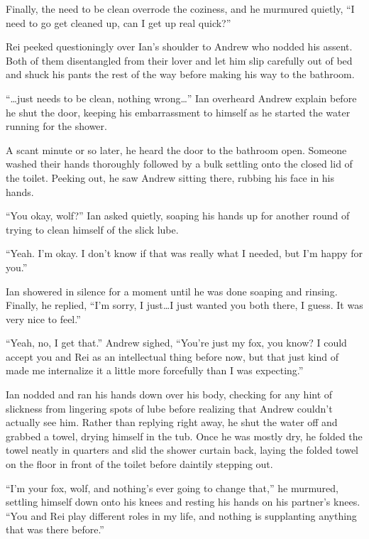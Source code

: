 \documentclass[12pt,letterpaper,oneside]{memoir}
\begin{document}
  Finally, the need to be clean overrode the coziness, and he murmured quietly, ``I need to go get cleaned up, can I get up real quick?''

  Rei peeked questioningly over Ian's shoulder to Andrew who nodded his assent. Both of them disentangled from their lover and let him slip carefully out of bed and shuck his pants the rest of the way before making his way to the bathroom.

  ``\ldots{}just needs to be clean, nothing wrong\ldots{}'' Ian overheard Andrew explain before he shut the door, keeping his embarrassment to himself as he started the water running for the shower.

  A scant minute or so later, he heard the door to the bathroom open. Someone washed their hands thoroughly followed by a bulk settling onto the closed lid of the toilet. Peeking out, he saw Andrew sitting there, rubbing his face in his hands.

  ``You okay, wolf?'' Ian asked quietly, soaping his hands up for another round of trying to clean himself of the slick lube.

  ``Yeah. I'm okay. I don't know if that was really what I needed, but I'm happy for you.''

  Ian showered in silence for a moment until he was done soaping and rinsing. Finally, he replied, ``I'm sorry, I just\ldots{}I just wanted you both there, I guess. It was very nice to feel.''

  ``Yeah, no, I get that.'' Andrew sighed, ``You're just my fox, you know? I could accept you and Rei as an intellectual thing before now, but that just kind of made me internalize it a little more forcefully than I was expecting.''

  Ian nodded and ran his hands down over his body, checking for any hint of slickness from lingering spots of lube before realizing that Andrew couldn't actually see him. Rather than replying right away, he shut the water off and grabbed a towel, drying himself in the tub. Once he was mostly dry, he folded the towel neatly in quarters and slid the shower curtain back, laying the folded towel on the floor in front of the toilet before daintily stepping out.

  ``I'm your fox, wolf, and nothing's ever going to change that,'' he murmured, settling himself down onto his knees and resting his hands on his partner's knees. ``You and Rei play different roles in my life, and nothing is supplanting anything that was there before.''
\end{document}
